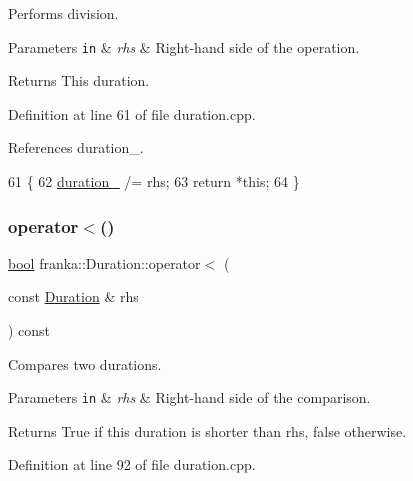 Performs division.


\begin{DoxyParams}[1]{Parameters}
\mbox{\tt in}  & {\em rhs} & Right-\/hand side of the operation.\\
\hline
\end{DoxyParams}
\begin{DoxyReturn}{Returns}
This duration. 
\end{DoxyReturn}


Definition at line 61 of file duration.\+cpp.



References duration\+\_\+.


\begin{DoxyCode}
61                                                     \{
62   \hyperlink{classfranka_1_1Duration_ae446c403b200f0dbf92fb51ca21e82ff}{duration\_} /= rhs;
63   \textcolor{keywordflow}{return} *\textcolor{keyword}{this};
64 \}
\end{DoxyCode}
\mbox{\label{classfranka_1_1Duration_af1650b31c1226a447406fc243f4a2ac1}} 
\subsubsection{\texorpdfstring{operator$<$()}{operator<()}}
{\footnotesize\ttfamily \hyperlink{classbool}{bool} franka\+::\+Duration\+::operator$<$ (\begin{DoxyParamCaption}\item[{const \hyperlink{classfranka_1_1Duration}{Duration} \&}]{rhs }\end{DoxyParamCaption}) const\hspace{0.3cm}{\ttfamily [noexcept]}}

Compares two durations.


\begin{DoxyParams}[1]{Parameters}
\mbox{\tt in}  & {\em rhs} & Right-\/hand side of the comparison.\\
\hline
\end{DoxyParams}
\begin{DoxyReturn}{Returns}
True if this duration is shorter than rhs, false otherwise. 
\end{DoxyReturn}


Definition at line 92 of file duration.\+cpp.



